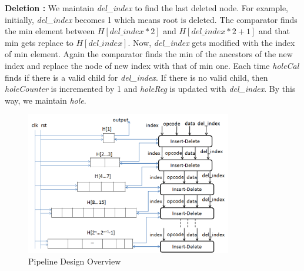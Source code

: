 \documentclass[10pt, conference, compsocconf]{IEEEtran}
\begin{document}
{\bf Deletion :} We maintain {\it del\_index} to find the last deleted node. For example, initially, {\it del\_index} becomes 1 which means root is deleted. The comparator finds the min element between $H[del\_index*2]$ and $H[del\_index*2 + 1]$ and that min gets replace to $H[del\_index]$. Now, {\it del\_index} gets modified with the index of min element. Again the comparator finds the min of the ancestors of the new index and replace the node of new index with that of min one. Each time {\it holeCal} finds if there is a valid child for {\it del\_index}. If there is no valid child, then {\it holeCounter} is incremented by 1 and {\it holeReg} is updated with {\it del\_index}. By this way, we maintain {\it hole}.

\begin{figure}[!ht]
  \centering
  \includegraphics[width=9cm]{Figures/1.png}
      \caption{Pipeline Design Overview}
    \label{fig1}
\end{figure}
\end{document}
